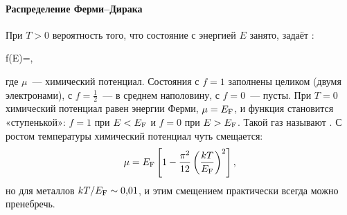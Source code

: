 \paragraph{Распределение Ферми--Дирака}
При $T>0$ вероятность того, что состояние с энергией $E$ занято,
задаёт :
\begin{keyeq}\label{eq:fermi-dirac}
f(E)=,
\end{keyeq}
где $\mu$~— химический потенциал. Состояния с $f=1$ заполнены целиком
(двумя электронами), с $f=\frac12$~— в среднем наполовину, с $f=0$~—
пусты. При $T=0$ химический потенциал равен энергии Ферми, $\mu=E_{\mathrm{F}}$, и
функция становится «ступенькой»: $f=1$ при $E<E_{\mathrm{F}}$ и $f=0$ при $E>E_{\mathrm{F}}$.
Такой газ называют . С ростом температуры
химический потенциал чуть смещается:
\begin{equation}\label{eq:mu-T}
\mu=E_{\mathrm{F}}\left[1-\frac{\pi^2}{12}\left(\frac{kT}{E_{\mathrm{F}}}\right)^2\right],
\end{equation}
но для металлов $kT/E_{\mathrm{F}}\sim0{,}01$, и этим смещением практически всегда
можно пренебречь.

